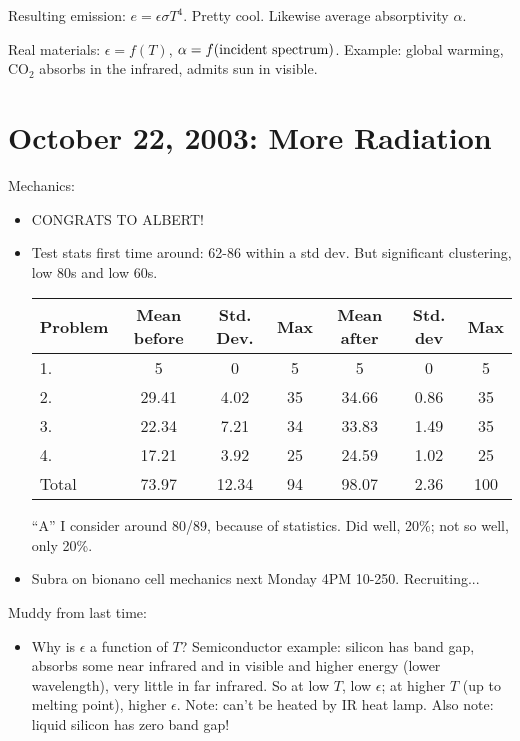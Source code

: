\documentclass{report}
\begin{document}
Resulting emission: $e = \epsilon\sigma T^4$.  Pretty cool.  Likewise average
absorptivity $\alpha$.

Real materials: $\epsilon=f(T)$, $\alpha=f({\rm incident\ spectrum})$.
Example: global warming, CO$_2$ absorbs in the infrared, admits sun in visible.
\newpage


\section{October 22, 2003: More Radiation}

Mechanics:
\begin{itemize}
\item CONGRATS TO ALBERT!
\item Test stats first time around: 62-86 within a std dev.  But significant
  clustering, low 80s and low 60s.
  \begin{center}
    \begin{tabular}{l|ccc|ccc|}
      Problem & Mean before & Std. Dev. & Max & Mean after & Std. dev & Max \\
      \hline
      1. & 5 & 0 & 5 & 5 & 0 & 5\\
      2. & 29.41 & 4.02 & 35 & 34.66 & 0.86 & 35 \\
      3. & 22.34 & 7.21 & 34 & 33.83 & 1.49 & 35 \\
      4. & 17.21 & 3.92 & 25 & 24.59 & 1.02 & 25 \\ \hline
      Total & 73.97 & 12.34 & 94 & 98.07 & 2.36 & 100 \\ \hline
    \end{tabular}
  \end{center}
  ``A'' I consider around 80/89, because of statistics.  Did well, 20\%; not so
  well, only 20\%.
\item Subra on bionano cell mechanics next Monday 4PM 10-250.  Recruiting...
\end{itemize}

\noindent Muddy from last time:
\begin{itemize}
\item Why is $\epsilon$ a function of $T$?  Semiconductor example: silicon has
  band gap, absorbs some near infrared and in visible and higher energy (lower
  wavelength), very little in far infrared.  So at low $T$, low $\epsilon$; at
  higher $T$ (up to melting point), higher $\epsilon$.  Note: can't be heated by
  IR heat lamp.  Also note: liquid silicon has zero band gap!
\end{itemize}
\end{document}
